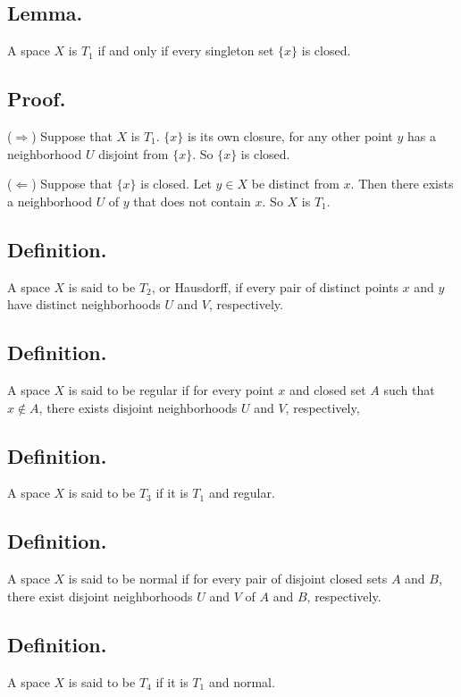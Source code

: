 \documentclass[titlepage]{article}
\begin{document}
\subsection{Lemma.} A space $X$ is $T_{1}$ if and only if every singleton set $\{x\}$ is closed.

\subsection{Proof.}

($\Rightarrow$) Suppose that $X$ is $T_{1}$. $\{x\}$ is its own closure, for any other point $y$ has a neighborhood $U$ disjoint from $\{x\}$. So $\{x\}$ is closed.

($\Leftarrow$) Suppose that $\{x\}$ is closed. Let $y \in X$ be distinct from $x$. Then there exists a neighborhood $U$ of $y$ that does not contain $x$. So $X$ is $T_{1}$.

\subsection{Definition.} A space $X$ is said to be $T_{2}$, or Hausdorff, if every pair of distinct points $x$ and $y$ have distinct neighborhoods $U$ and $V$, respectively.

\subsection{Definition.} A space $X$ is said to be regular if for every point $x$ and closed set $A$ such that $x \notin A$, there exists disjoint neighborhoods $U$ and $V$, respectively,

\subsection{Definition.} A space $X$ is said to be $T_{3}$ if it is $T_{1}$ and regular.

\subsection{Definition.} A space $X$ is said to be normal if for every pair of disjoint closed sets $A$ and $B$, there exist disjoint neighborhoods $U$ and $V$ of $A$ and $B$, respectively.

\subsection{Definition.} A space $X$ is said to be $T_{4}$ if it is $T_{1}$ and normal.
\end{document}
